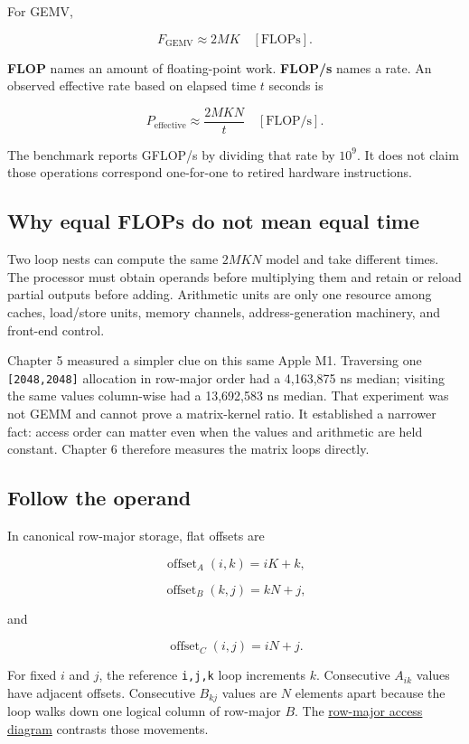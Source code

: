 \documentclass[
  10pt,
]{article}
\begin{document}
For GEMV,

\[
F_{\mathrm{GEMV}}\approx2MK\quad[\mathrm{FLOPs}].
\]

\textbf{FLOP} names an amount of floating-point work. \textbf{FLOP/s}
names a rate. An observed effective rate based on elapsed time \(t\)
seconds is

\[
P_{\mathrm{effective}}
\approx\frac{2MKN}{t}\quad[\mathrm{FLOP/s}].
\]

The benchmark reports GFLOP/s by dividing that rate by \(10^9\). It does
not claim those operations correspond one-for-one to retired hardware
instructions.

\subsection{Why equal FLOPs do not mean equal
time}\label{why-equal-flops-do-not-mean-equal-time}

Two loop nests can compute the same \(2MKN\) model and take different
times. The processor must obtain operands before multiplying them and
retain or reload partial outputs before adding. Arithmetic units are
only one resource among caches, load/store units, memory channels,
address-generation machinery, and front-end control.

Chapter 5 measured a simpler clue on this same Apple M1. Traversing one
\texttt{{[}2048,2048{]}} allocation in row-major order had a 4,163,875
ns median; visiting the same values column-wise had a 13,692,583 ns
median. That experiment was not GEMM and cannot prove a matrix-kernel
ratio. It established a narrower fact: access order can matter even when
the values and arithmetic are held constant. Chapter 6 therefore
measures the matrix loops directly.

\subsection{Follow the operand}\label{follow-the-operand}

In canonical row-major storage, flat offsets are

\[
\operatorname{offset}_A(i,k)=iK+k,
\]

\[
\operatorname{offset}_B(k,j)=kN+j,
\]

and

\[
\operatorname{offset}_C(i,j)=iN+j.
\]

For fixed \(i\) and \(j\), the reference \texttt{i,j,k} loop increments
\(k\). Consecutive \(A_{ik}\) values have adjacent offsets. Consecutive
\(B_{kj}\) values are \(N\) elements apart because the loop walks down
one logical column of row-major \(B\). The
\href{https://github.com/hermonai/inside-the-llm-engine/blob/astra-visual-rewrite/diagrams/linear/row-major-access.txt}{row-major
access diagram} contrasts those movements.
\end{document}
